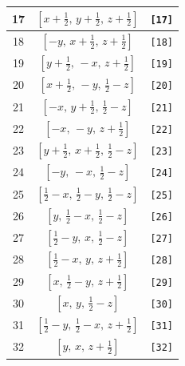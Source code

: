\documentclass[fleqn,8pt]{jsarticle}
\begin{document}
\begin{longtable}{ccc}
17 & $\left[ x + \frac{1}{2},\, y + \frac{1}{2},\, z + \frac{1}{2} \right]$ & {\tt [17]} \\ \hline
18 & $\left[ - y,\, x + \frac{1}{2},\, z + \frac{1}{2} \right]$ & {\tt [18]} \\ \hline
19 & $\left[ y + \frac{1}{2},\, - x,\, z + \frac{1}{2} \right]$ & {\tt [19]} \\ \hline
20 & $\left[ x + \frac{1}{2},\, - y,\, \frac{1}{2} - z \right]$ & {\tt [20]} \\ \hline
21 & $\left[ - x,\, y + \frac{1}{2},\, \frac{1}{2} - z \right]$ & {\tt [21]} \\ \hline
22 & $\left[ - x,\, - y,\, z + \frac{1}{2} \right]$ & {\tt [22]} \\ \hline
23 & $\left[ y + \frac{1}{2},\, x + \frac{1}{2},\, \frac{1}{2} - z \right]$ & {\tt [23]} \\ \hline
24 & $\left[ - y,\, - x,\, \frac{1}{2} - z \right]$ & {\tt [24]} \\ \hline
25 & $\left[ \frac{1}{2} - x,\, \frac{1}{2} - y,\, \frac{1}{2} - z \right]$ & {\tt [25]} \\ \hline
26 & $\left[ y,\, \frac{1}{2} - x,\, \frac{1}{2} - z \right]$ & {\tt [26]} \\ \hline
27 & $\left[ \frac{1}{2} - y,\, x,\, \frac{1}{2} - z \right]$ & {\tt [27]} \\ \hline
28 & $\left[ \frac{1}{2} - x,\, y,\, z + \frac{1}{2} \right]$ & {\tt [28]} \\ \hline
29 & $\left[ x,\, \frac{1}{2} - y,\, z + \frac{1}{2} \right]$ & {\tt [29]} \\ \hline
30 & $\left[ x,\, y,\, \frac{1}{2} - z \right]$ & {\tt [30]} \\ \hline
31 & $\left[ \frac{1}{2} - y,\, \frac{1}{2} - x,\, z + \frac{1}{2} \right]$ & {\tt [31]} \\ \hline
32 & $\left[ y,\, x,\, z + \frac{1}{2} \right]$ & {\tt [32]} \\
\end{longtable}
\end{document}

